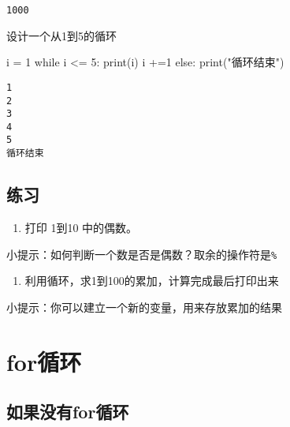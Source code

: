 \documentclass[
  letterpaper,
  DIV=11,
  numbers=noendperiod]{scrreprt}
\newenvironment{Shaded}{\begin{snugshade}}{\end{snugshade}}
\newcommand{\BuiltInTok}[1]{\textcolor[rgb]{0.00,0.23,0.31}{#1}}
\newcommand{\ControlFlowTok}[1]{\textcolor[rgb]{0.00,0.23,0.31}{#1}}
\newcommand{\DecValTok}[1]{\textcolor[rgb]{0.68,0.00,0.00}{#1}}
\newcommand{\NormalTok}[1]{\textcolor[rgb]{0.00,0.23,0.31}{#1}}
\newcommand{\OperatorTok}[1]{\textcolor[rgb]{0.37,0.37,0.37}{#1}}
\newcommand{\StringTok}[1]{\textcolor[rgb]{0.13,0.47,0.30}{#1}}
\providecommand{\tightlist}{%
  \setlength{\itemsep}{0pt}\setlength{\parskip}{0pt}}\usepackage{longtable,booktabs,array}
\begin{document}
\begin{verbatim}
1000
\end{verbatim}

设计一个从1到5的循环

\begin{Shaded}
\begin{Highlighting}[]
\NormalTok{i }\OperatorTok{=} \DecValTok{1}
\ControlFlowTok{while}\NormalTok{ i }\OperatorTok{\textless{}=} \DecValTok{5}\NormalTok{:}
    \BuiltInTok{print}\NormalTok{(i)}
\NormalTok{    i }\OperatorTok{+=}\DecValTok{1} 
\ControlFlowTok{else}\NormalTok{:}
    \BuiltInTok{print}\NormalTok{(}\StringTok{"循环结束"}\NormalTok{)}
\end{Highlighting}
\end{Shaded}

\begin{verbatim}
1
2
3
4
5
循环结束
\end{verbatim}

\hypertarget{ux7ec3ux4e60-2}{%
\subsection{练习}\label{ux7ec3ux4e60-2}}

\begin{enumerate}
\def\labelenumi{\arabic{enumi}.}
\tightlist
\item
  打印 1到10 中的偶数。
\end{enumerate}

小提示：如何判断一个数是否是偶数？取余的操作符是\texttt{\%}

\begin{enumerate}
\def\labelenumi{\arabic{enumi}.}
\setcounter{enumi}{1}
\tightlist
\item
  利用循环，求1到100的累加，计算完成最后打印出来
\end{enumerate}

小提示：你可以建立一个新的变量，用来存放累加的结果

\hypertarget{forux5faaux73af}{%
\section{for循环}\label{forux5faaux73af}}

\hypertarget{ux5982ux679cux6ca1ux6709forux5faaux73af}{%
\subsection{如果没有for循环}\label{ux5982ux679cux6ca1ux6709forux5faaux73af}}
\end{document}

